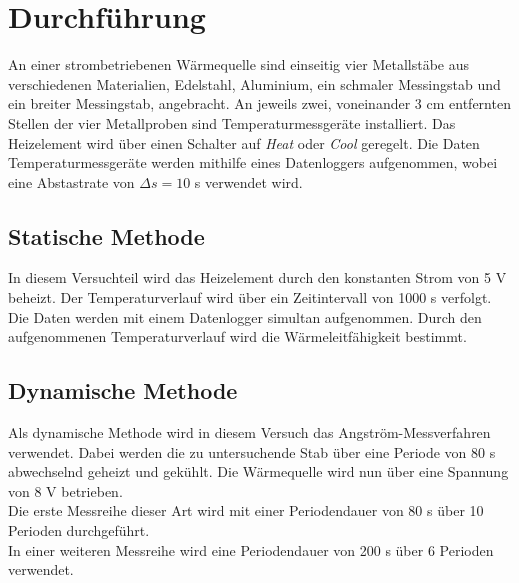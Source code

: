 \section{Durchführung}
\label{sec:Durchführung}
An einer strombetriebenen Wärmequelle sind einseitig vier Metallstäbe aus verschiedenen 
Materialien, Edelstahl, Aluminium, ein schmaler Messingstab und ein breiter Messingstab, 
angebracht. An jeweils zwei, voneinander 3 cm entfernten Stellen der vier Metallproben sind 
Temperaturmessgeräte installiert. Das Heizelement wird über einen Schalter auf \textit{Heat}
oder \textit{Cool} geregelt. Die Daten Temperaturmessgeräte werden
mithilfe eines Datenloggers aufgenommen, wobei eine Abstastrate von $\Delta s= 10$ s verwendet wird.


\subsection{Statische Methode}
    In diesem Versuchteil wird das Heizelement
    durch den konstanten Strom von 5 V beheizt. Der Temperaturverlauf
    wird über ein Zeitintervall von 1000 s 
    verfolgt. Die Daten werden mit einem Datenlogger simultan aufgenommen. 
    Durch den aufgenommenen Temperaturverlauf wird die Wärmeleitfähigkeit bestimmt.

\subsection{Dynamische Methode}
    Als dynamische Methode wird in diesem Versuch das Angström-Messverfahren verwendet. Dabei werden
    die zu untersuchende Stab über eine Periode von 80 s abwechselnd geheizt und gekühlt.
    Die Wärmequelle wird nun über eine Spannung von 8 V betrieben.\\
    Die erste Messreihe dieser Art wird mit einer Periodendauer von 80 s über 
    10 Perioden durchgeführt.\\
    In einer weiteren Messreihe wird eine Periodendauer von 200 s über 6 Perioden verwendet.

